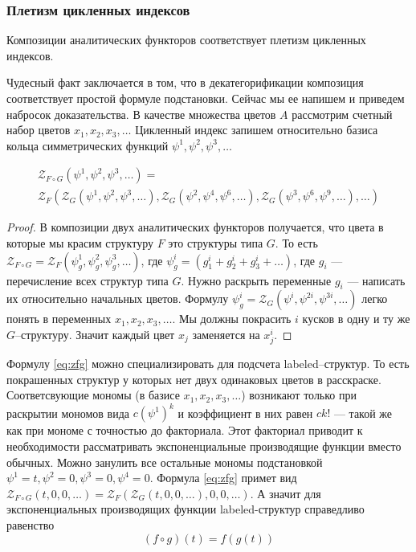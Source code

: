 \subsubsection{Плетизм цикленных индексов}
\begin{theorem}
Композиции аналитических функторов соответствует плетизм цикленных
индексов.
\end{theorem}
Чудесный факт заключается в том, что в декатегорификации
композиция соответствует простой формуле подстановки. Сейчас мы ее напишем и
приведем набросок доказательства. В качестве множества цветов $A$ рассмотрим
счетный набор цветов $x_1, x_2, x_3, \dots$ Цикленный индекс запишем
относительно базиса кольца симметрических функций $\psi^1, \psi^2, \psi^3, \dots$
\begin{statement}
\begin{multline}
\label{eq:zfg}
	\mathcal Z_{F \circ G} (\psi^1, \psi^2, \psi^3, \dots) = \\
	\mathcal Z_F(
		\mathcal Z_G(\psi^1, \psi^2, \psi^3, \dots),
		\mathcal Z_G(\psi^2, \psi^4, \psi^6, \dots),
		\mathcal Z_G(\psi^3, \psi^6, \psi^9, \dots),
		\dots
	)
\end{multline}
\end{statement}
\begin{proof}
В композиции двух аналитических функторов получается, что цвета в которые мы
красим структуру $F$ это структуры типа $G$. То есть $\mathcal Z_{F \circ G} =
\mathcal Z_F(\psi_g^1, \psi_g^2, \psi_g^3, \dots)$, где $\psi_g^i = (g_1^i +
g_2^i + g_3^i + \dots)$, где $g_i$ --- перечисление всех структур типа $G$.
Нужно раскрыть переменные $g_i $ --- написать их относительно начальных цветов.
Формулу $\psi_g^i = \mathcal Z_G(\psi^i, \psi^{2i}, \psi^{3i}, \dots)$ легко
понять в переменных $x_1, x_2, x_3, \dots$. Мы должны покрасить $i$ кусков в
одну и ту же $G$--структуру. Значит каждый цвет $x_j$ заменяется на $x_j^i$.
\end{proof}
\begin{remark}
Формулу \ref{eq:zfg} можно специализировать для подсчета labeled--структур. То
есть покрашенных структур у которых нет двух одинаковых цветов в расскраске.
Соответсвующие мономы (в базисе $x_1, x_2, x_3, \dots$) возникают только при
раскрытии мономов вида $c(\psi^1)^k$ и коэффициент в них равен $ck!$ --- такой
же как при мономе с точностью до факториала. Этот факториал приводит к
необходимости рассматривать экспоненциальные производящие функции вместо
обычных. Можно занулить все остальные мономы подстановкой $\psi^1 = t, \psi^2 =
0, \psi^3 = 0, \psi^4 = 0$. Формула \ref{eq:zfg} примет вид $
\mathcal Z_{F \circ G} (t, 0, 0, \dots) =
	\mathcal Z_F(
		\mathcal Z_G(t, 0, 0, \dots), 0, 0, \dots
	)
$.
А значит для экспоненциальных производящих функции labeled-структур справедливо
равенство
\begin{equation}
\label{eq:comp}
(f \circ g) (t) = f(g(t))
\end{equation}
\end{remark}

